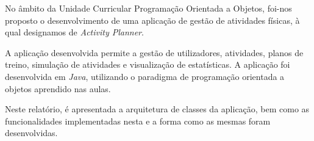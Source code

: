 \documentclass[a4paper,12pt]{scrreprt}
\begin{document}



\makecover



\renewenvironment{abstract}
 {\par\noindent\textbf{\Large\abstractname}\par\bigskip}
 {}

\begin{flushleft}
\begin{abstract}
    No âmbito da Unidade Curricular Programação Orientada a Objetos, foi-nos proposto o
    desenvolvimento de uma aplicação de gestão de atividades físicas, à qual designamos de \textit{Activity Planner}.

    A aplicação desenvolvida permite a gestão de utilizadores, atividades, planos de treino, simulação de atividades e
    visualização de estatísticas. A aplicação foi desenvolvida em \textit{Java}, utilizando o paradigma de programação
    orientada a objetos aprendido nas aulas.

    Neste relatório, é apresentada a arquitetura de classes da aplicação, bem
    como as funcionalidades implementadas nesta e a forma como as mesmas foram desenvolvidas.
\end{abstract}
\end{flushleft}



\renewcommand{\contentsname}{Índice}
\renewcommand{\listfigurename}{Índice de Figuras}
\end{document}
